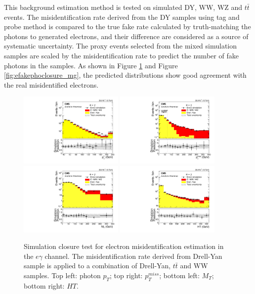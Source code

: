 \documentclass[thesis.tex]{subfiles}
\renewcommand\_{\textunderscore\allowbreak}
\begin{document}
   This background estimation method is tested on simulated DY, WW, WZ and $t\bar{t}$ events. The misidentification rate derived from the DY samples using tag and probe method is compared to the true fake rate calculated by truth-matching the photons to generated electrons, and their difference are considered as a source of systematic uncertainty. The proxy events selected from the mixed simulation samples are scaled by the misidentification rate to predict the number of fake photons in the samples. As shown in Figure \ref{fig:efakephoclosure_egamma} and Figure \ref{fig:efakephoclosure_mg}, the predicted distributions show good agreement with the real misidentified electrons.  

\begin{figure}[hbtp]
  \centering
    \includegraphics[width=0.45\textwidth]{Fig/closure_elefakepho_PhotonEt_eg.pdf}
    \includegraphics[width=0.45\textwidth]{Fig/closure_elefakepho_MET_eg.pdf}
    \includegraphics[width=0.45\textwidth]{Fig/closure_elefakepho_MT_eg.pdf}
    \includegraphics[width=0.45\textwidth]{Fig/closure_elefakepho_HT_eg.pdf}
  \caption{Simulation closure test for electron misidentification estimation in the $e\gamma$ channel. The misidentification rate derived from Drell-Yan sample is applied to a combination of Drell-Yan, $t\bar{t}$ and WW samples. Top left: photon $p_T$; top right: $p_T^{miss}$; bottom left: $M_T$; bottom right: $HT$.}
  \label{fig:efakephoclosure_egamma}
\end{figure}
\end{document}
